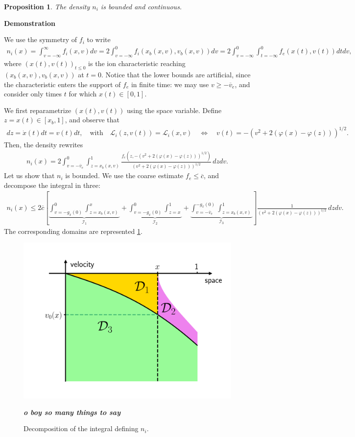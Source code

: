 \documentclass{article}
\newtheorem{proposition}{Proposition}[section]
\numberwithin{equation}{section}
\newcommand{\todo}[1]{{\color{red}\textbf{#1}}}
\newcommand{\mysubcaption}[1]{
	\vspace*{5pt}
	\begin{minipage}{0.8\linewidth}
		\begin{center}
			\footnotesize\emph{#1}
		\end{center}
	\end{minipage}
}
\newcommand{\myproof}[1]{
	\noindent \textbf{Demonstration}
	{\small	#1 \hfill \qedsymbol}
}
\newcommand{\ve}{{\overline{v}_e}} %
\newcommand{\DomUpL}{{\mathcal{D}_1}} %
\newcommand{\DomUpR}{{\mathcal{D}_2}} %
\newcommand{\DomLow}{{\mathcal{D}_3}} %
\newcommand{\IntUpL}{{\mathcal{I}_1}} %
\newcommand{\IntUpR}{{\mathcal{I}_2}} %
\newcommand{\IntLow}{{\mathcal{I}_3}} %
\newcommand{\maxfe}{{\overline{c}}} %
\begin{document}
\begin{proposition}
	The density $n_i$ is bounded and continuous.
\end{proposition}

\myproof{
	We use the symmetry of $f_i$ to write
	\begin{align*}
		n_i(x) = \int_{v=-\infty}^{\infty} f_i(x,v) dv = 2 \int_{v=-\infty}^{0} f_i(x_b(x,v), v_b(x,v)) dv = 2 \int_{v=-\infty}^{0} \int_{t=-\infty}^{0} f_e(x(t),v(t)) dt dv,
	\end{align*}
	where $(x(t),v(t))_{t\leqslant0}$ is the ion characteristic reaching $(x_b(x,v),v_b(x,v))$ at $t=0$. Notice that the lower bounds are artificial, since the characteristic enters the support of $f_e$ in finite time: we may use $v \geqslant -\ve$, and consider only times $t$ for which $x(t) \in [0,1]$. 
	
	We first reparametrize $(x(t),v(t))$ using the space variable. Define $z = x(t) \in[x_b,1]$, and observe that
	\begin{align*}
		dz = \dot{x}(t) dt = v(t) dt, \quad \text{with}\quad \mathcal{L}_i(z,v(t)) = \mathcal{L}_i(x,v) \quad\iff\quad v(t) = -\left(v^2 + 2\left(\varphi(x) - \varphi(z)\right)\right)^{1/2}.
	\end{align*}
	Then, the density rewrites
	\begin{align*}
		n_i(x) = 2 \int_{v=-\ve}^{0} \int_{z=x_b(x,v)}^{1} \frac{f_e\left(z, -\left(v^2 + 2\left(\varphi(x) - \varphi(z)\right)\right)^{1/2}\right)}{\left(v^2 + 2\left(\varphi(x) - \varphi(z)\right)\right)^{1/2}} \, dz dv.
	\end{align*}
	Let us show that $n_i$ is bounded. We use the coarse estimate $f_e \leqslant \maxfe$, and decompose the integral in three:
	\begin{align*}
		n_i(x) \leqslant 2 \maxfe \left[
		\underbrace{\int_{v=-g_x(0)}^{0} \int_{z=x_b(x,v)}^{x}}_{\IntUpL} + 
		\underbrace{\int_{v=-g_x(0)}^{0} \int_{z=x}^{1}}_{\IntUpR} + 
		\underbrace{\int_{v=-\ve}^{-g_x(0)} \int_{z=x_b(x,v)}^{1}}_{\IntLow} \right] 
		\frac{1}{\left(v^2 + 2\left(\varphi(x) - \varphi(z)\right)\right)^{1/2}} \, dz dv.
	\end{align*}
	The corresponding domains are represented \cref{fig:charmaps_domainmap}. 
	\begin{figure}
		\centering
		\includegraphics[width=0.5\linewidth]{images/fpcharmaps_domainmap}
		\caption{Decomposition of the integral defining $n_i$.}
		\mysubcaption{\todo{o boy so many things to say}}
		\label{fig:charmaps_domainmap}
	\end{figure}
	
}
\end{document}
